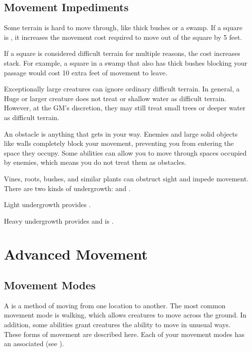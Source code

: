   \subsection{Movement Impediments}

    Some terrain is hard to move through, like thick bushes or a swamp.
    If a square is , it increases the movement cost required to move out of the square by 5 feet.

    If a square is considered difficult terrain for multiple reasons, the cost increases stack.
    For example, a square in a swamp that also has thick bushes blocking your passage would cost 10 extra feet of movement to leave.

    Exceptionally large creatures can ignore ordinary difficult terrain.
    In general, a Huge or larger creature does not treat  or shallow water as difficult terrain.
    However, at the GM's discretion, they may still treat small trees or deeper water as difficult terrain.

    An obstacle is anything that gets in your way.
    Enemies and large solid objects like walls completely block your movement, preventing you from entering the space they occupy.
    Some abilities can allow you to move through spaces occupied by enemies, which means you do not treat them as obstacles.

     Vines, roots, bushes, and similar plants can obstruct sight and impede movement.
    There are two kinds of undergrowth:  and .

    Light undergrowth provides .

    Heavy undergrowth provides  and is .

\section{Advanced Movement}

  \subsection{Movement Modes}\label{Movement Modes}
    A  is a method of moving from one location to another.
    The most common movement mode is walking, which allows creatures to move across the ground.
    In addition, some abilities grant creatures the ability to move in unusual ways.
    These forms of movement are described here.
    Each of your movement modes has an associated  (see ).

